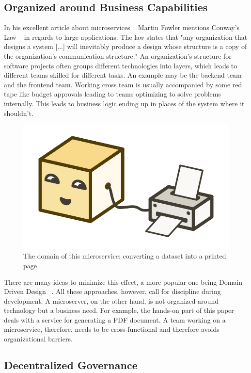 \subsection{Organized around Business Capabilities}
\label{sec:theory:what:capabilities}

In his excellent article about microservices ~\cite{microservices.2014} Martin Fowler mentions Conway's Law ~\cite{conway.1968} in regards to large applications. The law states that "any organization that designs a system [...] will inevitably produce a design whose structure is a copy of the organization's communication structure." An organization's structure for software projects often groups different technologies into layers, which leads to different teams skilled for different tasks. An example may be the backend team and the frontend team. Working cross team is usually accompanied by some red tape like budget approvals leading to teams optimizing to solve problems internally. This leads to business logic ending up in places of the system where it shouldn't.

\begin{figure}[ht]
  \centering
  \includegraphics[width=0.4\linewidth]{assets/illustration-microservice-printer.png}
  \caption{The domain of this microservice: converting a dataset into a printed page}
\end{figure}

There are many ideas to minimize this effect, a more popular one being Domain-Driven Design ~\cite{evans.2003}. All these approaches, however, call for discipline during development. A microserver, on the other hand, is not organized around technology but a business need. For example, the hands-on part of this paper deals with a service for generating a PDF document. A team working on a microservice, therefore, needs to be cross-functional and therefore avoids organizational barriers.


\subsection{Decentralized Governance}


